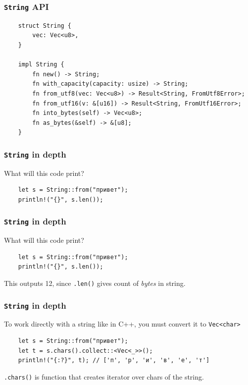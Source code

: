 \documentclass[aspectratio=1610,t]{beamer}
\begin{document}

\begin{frame}[fragile,c]
\frametitle{\texttt{String} API}
\begin{verbatim}
    struct String {
        vec: Vec<u8>,
    }

    impl String {
        fn new() -> String;
        fn with_capacity(capacity: usize) -> String;
        fn from_utf8(vec: Vec<u8>) -> Result<String, FromUtf8Error>;
        fn from_utf16(v: &[u16]) -> Result<String, FromUtf16Error>;
        fn into_bytes(self) -> Vec<u8>;
        fn as_bytes(&self) -> &[u8];
    }
\end{verbatim}
\end{frame}


\begin{frame}[fragile]
\frametitle{\texttt{String} in depth}
What will this code print?

\begin{verbatim}
    let s = String::from("привет");
    println!("{}", s.len());
\end{verbatim}
\end{frame}


\begin{frame}[fragile]
\frametitle{\texttt{String} in depth}
What will this code print?

\begin{verbatim}
    let s = String::from("привет");
    println!("{}", s.len());
\end{verbatim}

This outputs 12, since \texttt{.len()} gives count of \textit{bytes} in string.
\end{frame}


\begin{frame}[fragile]
\frametitle{\texttt{String} in depth}
To work directly with a string like in C++, you must convert it to \texttt{Vec<char>}

\begin{verbatim}
    let s = String::from("привет");
    let t = s.chars().collect::<Vec<_>>();
    println!("{:?}", t); // ['п', 'р', 'и', 'в', 'е', 'т']
\end{verbatim}

\texttt{.chars()} is function that creates iterator over chars of the string.
\end{frame}
\end{document}
